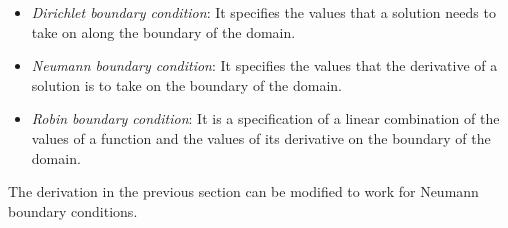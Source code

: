 \documentclass[book.tex]{subfiles}
\begin{document}
\begin{itemize}
	\item \textit{Dirichlet boundary condition}: It specifies the values that a solution needs to take on along the boundary of the domain.
	\item \textit{Neumann boundary condition}: It specifies the values that the derivative of a solution is to take on the boundary of the domain.
	\item \textit{Robin boundary condition}: It is a specification of a linear combination of the values of a function and the values of its derivative on the boundary of the domain.
\end{itemize}
The derivation in the previous section can be modified to work for Neumann boundary conditions.






\end{document}
